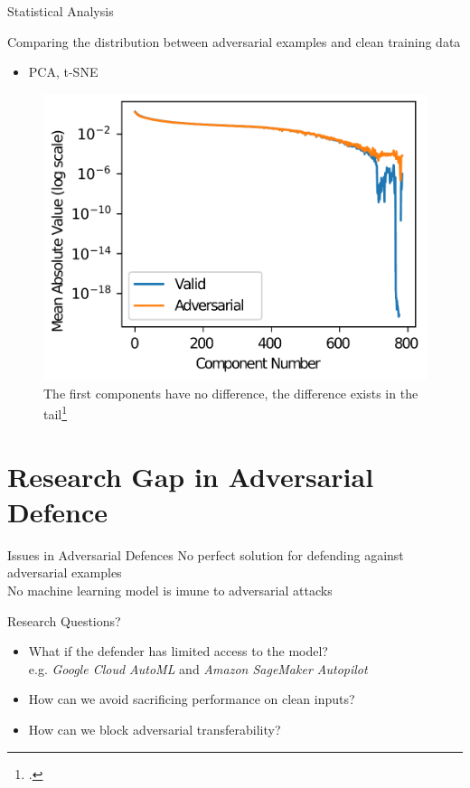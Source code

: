 \documentclass[9pt]{beamer}
\begin{document}
\begin{frame}{Statistical Analysis}
\label{stats}

Comparing the distribution between adversarial examples and clean training data

\begin{examples}
    \begin{itemize}
        \scriptsize
        \item PCA, t-SNE
    \end{itemize}
\end{examples}

\begin{figure}
    \centering
    \small
    \includegraphics[width=0.3\linewidth]{images/pca.png}
    \caption{The first components have no difference, the difference exists in the tail\footcite{carlini2017adversarial}}
\end{figure}

\hyperlink{adv_examples}{}
\end{frame}

\section{Research Gap in Adversarial Defence}

\begin{frame}{Issues in Adversarial Defences}
No perfect solution for defending against adversarial examples\\
No machine learning model is imune to adversarial attacks\\

\begin{block}{Research Questions?}
    \begin{itemize}
        \item What if the defender has limited access to the model?\\e.g. \textit{Google Cloud AutoML} and \textit{Amazon SageMaker Autopilot}
        \item How can we avoid sacrificing performance on clean inputs?
        \item How can we block adversarial transferability?
    \end{itemize}
\end{block}

\end{frame}
\end{document}
